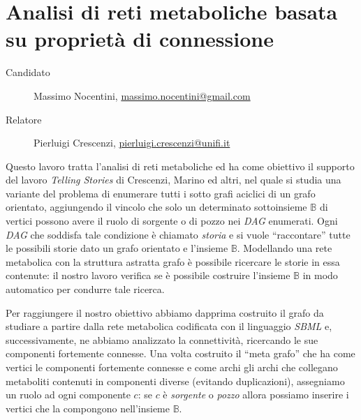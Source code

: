 \documentclass[twoside,openright,titlepage,fleqn,
headinclude,11pt,a4paper,BCOR5mm,footinclude ]{scrbook}
\begin{document}
\frenchspacing
\raggedbottom
{}
\pagestyle{plain}
%
\pagestyle{scrheadings}

\lstset{
	language = java
	, numbers = left 
	, basicstyle=\sffamily%
	, tabsize=2
	, captionpos=b
	, breaklines=true
	, showspaces=false
	, showstringspaces=false
}

\chapter*{Analisi di reti metaboliche basata su propriet\`a di
  connessione}
\begin{description}
\item[Candidato] Massimo Nocentini, \url{massimo.nocentini@gmail.com}
\item[Relatore] Pierluigi Crescenzi, \url{pierluigi.crescenzi@unifi.it}
\end{description}
Questo lavoro tratta l'analisi di reti metaboliche ed ha come
obiettivo il supporto del lavoro \emph{Telling Stories} di Crescenzi,
Marino ed altri, nel quale si studia una variante del problema di
enumerare tutti i sotto grafi aciclici di un grafo orientato,
aggiungendo il vincolo che solo un determinato sottoinsieme
$\mathbb{B}$ di vertici possono avere il ruolo di sorgente o di pozzo
nei \emph{DAG} enumerati. Ogni \emph{DAG} che soddisfa tale condizione
\`e chiamato \emph{storia} e si vuole ``raccontare'' tutte le
possibili storie dato un grafo orientato e l'insieme
$\mathbb{B}$. Modellando una rete metabolica con la struttura astratta
grafo \`e possibile ricercare le storie in essa contenute: il nostro
lavoro verifica se \`e possibile costruire l'insieme $\mathbb{B}$ in
modo automatico per condurre tale ricerca.

Per raggiungere il nostro obiettivo abbiamo dapprima costruito il
grafo da studiare a partire dalla rete metabolica codificata con il
linguaggio \emph{SBML} e, successivamente, ne abbiamo analizzato la
connettivit\`a, ricercando le sue componenti fortemente connesse. Una
volta costruito il ``meta grafo'' che ha come vertici le componenti
fortemente connesse e come archi gli archi che collegano metaboliti
contenuti in componenti diverse (evitando duplicazioni), assegniamo un
ruolo ad ogni componente $c$: se $c$ \`e \emph{sorgente} o
\emph{pozzo} allora possiamo inserire i vertici che la compongono
nell'insieme $\mathbb{B}$.
\end{document}
